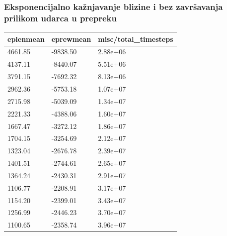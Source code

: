 \documentclass{beamer}
\begin{document}
\begin{frame}
	\frametitle{Eksponencijalno kažnjavanje blizine i bez završavanja prilikom udarca u prepreku}

	\begin{table}[ht!]
		\centering
		\label{tab:rub}
		\begin{tabular}{@{}lll@{}}
			\hline
			eplenmean & eprewmean & misc/total\_timesteps \\
			\hline
			\hline
			4661.85   & -9838.50  & 2.88e+06              \\
			4137.11   & -8440.07  & 5.51e+06              \\
			3791.15   & -7692.32  & 8.13e+06              \\
			2962.36   & -5753.18  & 1.07e+07              \\
			2715.98   & -5039.09  & 1.34e+07              \\
			2221.33   & -4388.06  & 1.60e+07              \\
			1667.47   & -3272.12  & 1.86e+07              \\
			1704.15   & -3254.69  & 2.12e+07              \\
			1323.04   & -2676.78  & 2.39e+07              \\
			1401.51   & -2744.61  & 2.65e+07              \\
			1364.24   & -2430.31  & 2.91e+07              \\
			1106.77   & -2208.91  & 3.17e+07              \\
			1154.20   & -2399.01  & 3.43e+07              \\
			1256.99   & -2446.23  & 3.70e+07              \\
			1100.65   & -2358.74  & 3.96e+07              \\
			\hline
		\end{tabular}
	\end{table}

\end{frame}
\end{document}
